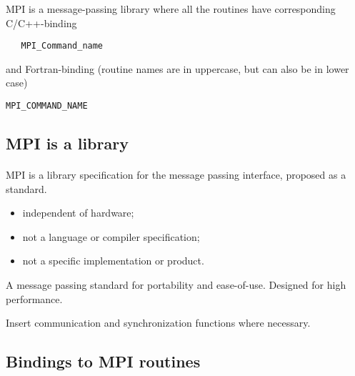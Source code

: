 \documentclass[%
oneside,                 %
final,                   %
10pt]{article}
\begin{document}
MPI is a message-passing library where all the routines
have corresponding C/C++-binding
\begin{verbatim}
   MPI_Command_name
\end{verbatim}
and Fortran-binding (routine names are in uppercase, but can also be in lower case)
\begin{Verbatim}[numbers=none,fontsize=\fontsize{9pt}{9pt},baselinestretch=0.95]
   MPI_COMMAND_NAME
\end{Verbatim}




\subsection*{MPI is a library}

\paragraph{}
MPI is a library specification for the message passing interface,
proposed as a standard.

\begin{itemize}
\item independent of hardware;

\item not a language or compiler specification;

\item not a specific implementation or product.
\end{itemize}

\noindent
A message passing standard for portability and ease-of-use. 
Designed for high performance.

Insert communication and synchronization functions where necessary.





\subsection*{Bindings to MPI routines}

\paragraph{}
\end{document}

